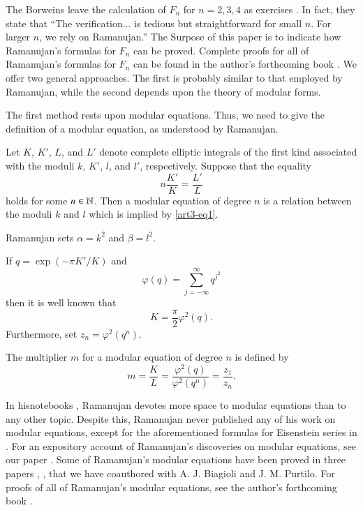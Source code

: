 The Borweins leave the calculation of $F_n$ for $n = 2, 3, 4$ as exercises \cite[p. 161]{art3-key6}. In fact, they \cite[9. 158]{art3-key6} state that ``The verification... is tedious but straightforward for small $n$. For larger $n$, we rely on Ramanujan.'' The Surpose of this paper is to indicate how Ramanujan's formulas for $F_n$ can be proved. Complete proofs for all of Ramanujan's formulas for $F_n$ can be found in the author's forthcoming book \cite{art3-key2}. We offer two general approaches. The first is probably similar to that employed by Ramanujan, while the second depends upon the theory of modular forms. 

The first method rests upon modular equations. Thus, we need to give the definition of a modular equation, as understood by Ramanujan.

\begin{defi*}
Let $K$, $K'$, $L$, and $L'$ denote complete elliptic integrals of the first kind associated with the moduli $k$, $K'$, $l$, and $l'$, respectively. Suppose that the equality
\begin{equation}
n\frac{K'}{K} = \frac{L'}{L} \label{art3-eq1}
\end{equation}
holds for some $n \in \mathbb{N}$. Then a modular equation of degree $n$ is a relation between the moduli $k$ and $l$ which is implied by \eqref{art3-eq1}.
\end{defi*}

Ramanujan sets $\alpha =k^2$ and $\beta = l^2$.

If $q= \exp (-\pi K'/K)$ and 
$$
\varphi (q) = \sum\limits^\infty_{j = - \infty} q^{j^2}
$$
then it is well known that
$$
K = \frac{\pi}{2} \varphi^2 (q).
$$
Furthermore, set $z_n = \varphi^2 (q^n)$.

\begin{defi*}
The multiplier $m$ for a modular equation of degree $n$ is defined by
$$
m = \frac{K}{L} = \frac{\varphi^2(q)}{\varphi^2 (q^n)} = \frac{z_1}{z_n}.
$$
\end{defi*}

In his\pageoriginale notebooks \cite{art3-key9}, Ramanujan devotes more space to modular equations than to any other topic. Despite this, Ramanujan never published any of his work on modular equations, except for the aforementioned formulas for Eisenstein series in \cite{art3-key8}. For an expository account of Ramanujan's discoveries on modular equations, see our paper \cite{art3-key1}. Some of Ramanujan's modular equations have been proved in three papers \cite{art3-key3}, \cite{art3-key4}, \cite{art3-key5} that we have coauthored with A. J. Biagioli and J. M. Purtilo. For proofs of all of Ramanujan's modular equations, see the author's forthcoming book \cite{art3-key2}.

